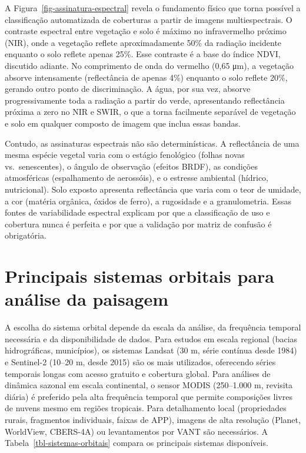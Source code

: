 \documentclass[
  portuguese,
  11pt,
  a4paper,
  open=any]{scrbook}
\begin{document}
A Figura~\ref{fig-assinatura-espectral} revela o fundamento físico que
torna possível a classificação automatizada de coberturas a partir de
imagens multiespectrais. O contraste espectral entre vegetação e solo é
máximo no infravermelho próximo (NIR), onde a vegetação reflete
aproximadamente 50\% da radiação incidente enquanto o solo reflete
apenas 25\%. Esse contraste é a base do índice NDVI, discutido adiante.
No comprimento de onda do vermelho (0,65 μm), a vegetação absorve
intensamente (reflectância de apenas 4\%) enquanto o solo reflete 20\%,
gerando outro ponto de discriminação. A água, por sua vez, absorve
progressivamente toda a radiação a partir do verde, apresentando
reflectância próxima a zero no NIR e SWIR, o que a torna facilmente
separável de vegetação e solo em qualquer composto de imagem que inclua
essas bandas.

Contudo, as assinaturas espectrais não são determinísticas. A
reflectância de uma mesma espécie vegetal varia com o estágio fenológico
(folhas novas vs.~senescentes), o ângulo de observação (efeitos BRDF),
as condições atmosféricas (espalhamento de aerossóis), e o estresse
ambiental (hídrico, nutricional). Solo exposto apresenta reflectância
que varia com o teor de umidade, a cor (matéria orgânica, óxidos de
ferro), a rugosidade e a granulometria. Essas fontes de variabilidade
espectral explicam por que a classificação de uso e cobertura nunca é
perfeita e por que a validação por matriz de confusão é obrigatória.

\section{Principais sistemas orbitais para análise da
paisagem}\label{principais-sistemas-orbitais-para-anuxe1lise-da-paisagem}

A escolha do sistema orbital depende da escala da análise, da frequência
temporal necessária e da disponibilidade de dados. Para estudos em
escala regional (bacias hidrográficas, municípios), os sistemas Landsat
(30 m, série contínua desde 1984) e Sentinel-2 (10--20 m, desde 2015)
são os mais utilizados, oferecendo séries temporais longas com acesso
gratuito e cobertura global. Para análises de dinâmica sazonal em escala
continental, o sensor MODIS (250--1.000 m, revisita diária) é preferido
pela alta frequência temporal que permite composições livres de nuvens
mesmo em regiões tropicais. Para detalhamento local (propriedades
rurais, fragmentos individuais, faixas de APP), imagens de alta
resolução (Planet, WorldView, CBERS-4A) ou levantamentos por VANT são
necessários. A Tabela~\ref{tbl-sistemas-orbitais} compara os principais
sistemas disponíveis.
\end{document}
